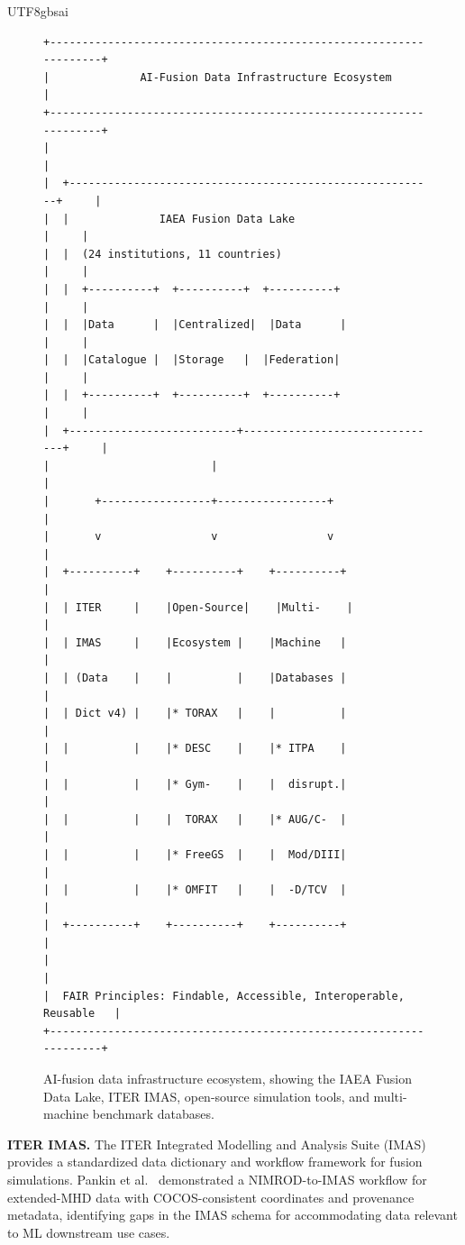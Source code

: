 \documentclass[12pt,a4paper]{article}
\begin{document}
\begin{CJK}{UTF8}{gbsai}
\begin{figure}[htbp]
\centering
\small
\begin{verbatim}
+-------------------------------------------------------------------+
|              AI-Fusion Data Infrastructure Ecosystem               |
+-------------------------------------------------------------------+
|                                                                   |
|  +---------------------------------------------------------+     |
|  |              IAEA Fusion Data Lake                       |     |
|  |  (24 institutions, 11 countries)                         |     |
|  |  +----------+  +----------+  +----------+               |     |
|  |  |Data      |  |Centralized|  |Data      |               |     |
|  |  |Catalogue |  |Storage   |  |Federation|               |     |
|  |  +----------+  +----------+  +----------+               |     |
|  +--------------------------+-------------------------------+     |
|                         |                                         |
|       +-----------------+-----------------+                      |
|       v                 v                 v                       |
|  +----------+    +----------+    +----------+                    |
|  | ITER     |    |Open-Source|    |Multi-    |                    |
|  | IMAS     |    |Ecosystem |    |Machine   |                    |
|  | (Data    |    |          |    |Databases |                    |
|  | Dict v4) |    |* TORAX   |    |          |                    |
|  |          |    |* DESC    |    |* ITPA    |                    |
|  |          |    |* Gym-    |    |  disrupt.|                    |
|  |          |    |  TORAX   |    |* AUG/C-  |                    |
|  |          |    |* FreeGS  |    |  Mod/DIII|                    |
|  |          |    |* OMFIT   |    |  -D/TCV  |                    |
|  +----------+    +----------+    +----------+                    |
|                                                                   |
|  FAIR Principles: Findable, Accessible, Interoperable, Reusable   |
+-------------------------------------------------------------------+
\end{verbatim}
\caption{AI-fusion data infrastructure ecosystem, showing the IAEA Fusion Data Lake, ITER IMAS, open-source simulation tools, and multi-machine benchmark databases.}
\label{fig:data-ecosystem}
\end{figure}

\textbf{ITER IMAS.} The ITER Integrated Modelling and Analysis Suite (IMAS) provides a standardized data dictionary and workflow framework for fusion simulations. Pankin et al.~\citep{Pankin2026} demonstrated a NIMROD-to-IMAS workflow for extended-MHD data with COCOS-consistent coordinates and provenance metadata, identifying gaps in the IMAS schema for accommodating data relevant to ML downstream use cases.


\end{CJK}
\end{document}
